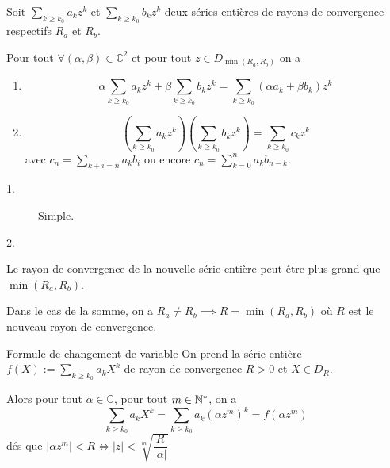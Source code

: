 \documentclass[a4paper,12pt]{article}
\begin{document}
\begin{proposition}{}{}
    Soit $\sum\limits_{k \geq k_0} a_k z^k$ et $\sum\limits_{k \geq k_0} b_k z^k$ deux séries entières de rayons de convergence respectifs $R_a$ et $R_b$.

    Pour tout $\forall (\alpha, \beta) \in \mathbb{C}^2$ et pour tout $z \in D_{\min(R_a, R_b)}$ on a
    \begin{enumerate}
        \item 
        $$
        \alpha \sum_{k \geq k_0} a_k z^k + \beta \sum_{k \geq k_0} b_k z^k = \sum_{k \geq k_0} (\alpha a_k + \beta b_k) z^k
        $$

        \item
        $$
        \left(\sum_{k \geq k_0} a_k z^k\right) \left(\sum_{k \geq k_0} b_k z^k\right) = \sum_{k \geq k_0} c_k z^k
        $$
        avec $c_n = \sum_{k + i = n} a_k b_i$ ou encore $c_n = \sum_{k = 0}^n a_k b_{n - k}$.
    \end{enumerate}
\end{proposition}

\begin{demonstration}
    \begin{description}
        \item[1.]
        Simple.

        \item[2.]
        
    \end{description}
\end{demonstration}

\begin{remarque}
    Le rayon de convergence de la nouvelle série entière peut être plus grand que $\min(R_a, R_b)$.

    Dans le cas de la somme, on a $R_a \neq R_b \implies R = \min(R_a, R_b)$ où $R$ est le nouveau rayon de convergence.
\end{remarque}

\clearpage

\begin{proposition}{Formule de changement de variable}{}
    On prend la série entière $f(X) := \sum\limits_{k \geq k_0} a_k X^k$ de rayon de convergence $R > 0$ et $X \in D_R$.

    Alors pour tout $\alpha \in \mathbb{C}$, pour tout $m \in \mathbb{N}^*$, on a
    $$
    \sum_{k \geq k_0} a_k X^k = \sum_{k \geq k_0} a_k (\alpha z^m)^k = f(\alpha z^m)
    $$
    dés que $|\alpha z^m| < R \iff |z| < \sqrt[m]{\dfrac{R}{|\alpha|}}$
\end{proposition}
\end{document}
